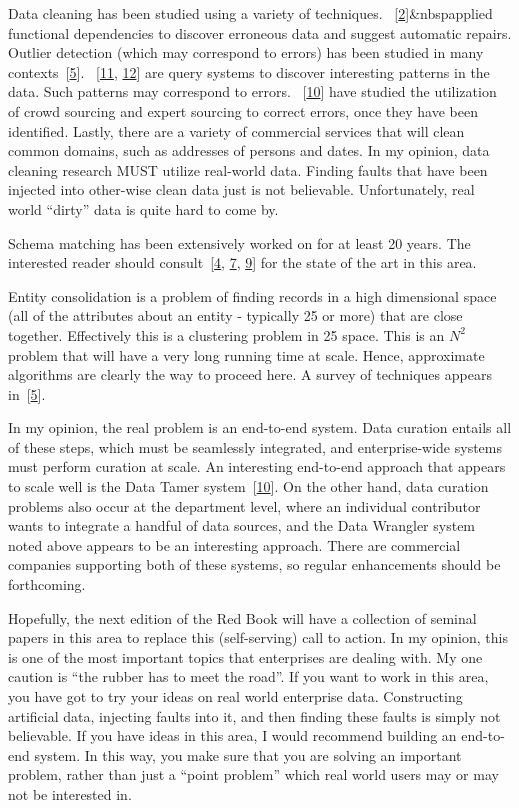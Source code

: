 \documentclass[b5paper,11pt,twoside,openright]{book}
\begin{document}
Data cleaning has been studied using a variety of techniques.
~{{[}\protect\hyperlink{ref-fd-cleaning}{2}{]}}\&nbspapplied functional
dependencies to discover erroneous data and suggest automatic repairs.
Outlier detection (which may correspond to errors) has been studied in
many contexts~{{[}\protect\hyperlink{ref-fnt-cleaning}{5}{]}}.
~{{[}\protect\hyperlink{ref-seedb}{11},
  \protect\hyperlink{ref-scorpion}{12}{]}} are query systems to discover
interesting patterns in the data. Such patterns may correspond to
errors. ~{{[}\protect\hyperlink{ref-tamer}{10}{]}} have studied the
utilization of crowd sourcing and expert sourcing to correct errors,
once they have been identified. Lastly, there are a variety of
commercial services that will clean common domains, such as addresses of
persons and dates. In my opinion, data cleaning research MUST utilize
real-world data. Finding faults that have been injected into other-wise
clean data just is not believable. Unfortunately, real world ``dirty''
data is quite hard to come by.

Schema matching has been extensively worked on for at least 20 years.
The interested reader should
consult~{{[}\protect\hyperlink{ref-garlic1}{4},
  \protect\hyperlink{ref-clio}{7}, \protect\hyperlink{ref-garlic2}{9}{]}}
for the state of the art in this area.

Entity consolidation is a problem of finding records in a high
dimensional space (all of the attributes about an entity - typically 25
or more) that are close together. Effectively this is a clustering
problem in 25 space. This is an $N ^ 2$ problem that will have a very
long running time at scale. Hence, approximate algorithms are clearly
the way to proceed here. A survey of techniques appears
in~{{[}\protect\hyperlink{ref-fnt-cleaning}{5}{]}}.

In my opinion, the real problem is an end-to-end system. Data curation
entails all of these steps, which must be seamlessly integrated, and
enterprise-wide systems must perform curation at scale. An interesting
end-to-end approach that appears to scale well is the Data Tamer
system~{{[}\protect\hyperlink{ref-tamer}{10}{]}}. On the other hand,
data curation problems also occur at the department level, where an
individual contributor wants to integrate a handful of data sources, and
the Data Wrangler system noted above appears to be an interesting
approach. There are commercial companies supporting both of these
systems, so regular enhancements should be forthcoming.

Hopefully, the next edition of the Red Book will have a collection of
seminal papers in this area to replace this (self-serving) call to
action. In my opinion, this is one of the most important topics that
enterprises are dealing with. My one caution is ``the rubber has to meet
the road''. If you want to work in this area, you have got to try your
ideas on real world enterprise data. Constructing artificial data,
injecting faults into it, and then finding these faults is simply not
believable. If you have ideas in this area, I would recommend building
an end-to-end system. In this way, you make sure that you are solving an
important problem, rather than just a ``point problem'' which real world
users may or may not be interested in.
\end{document}
